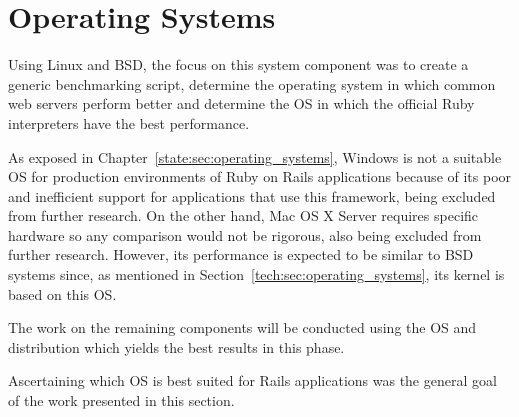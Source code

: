 \section{Operating Systems} %
\label{solution:sec:operating_systems}
Using Linux and BSD, the focus on this system component was to create a generic benchmarking script, determine the operating system in which common web servers perform better and determine the OS in which the official Ruby interpreters have the best performance.

As exposed in Chapter~\ref{state:sec:operating_systems}, Windows is not a suitable OS for production environments of Ruby on Rails applications because of its poor and inefficient support for applications that use this framework, being excluded from further research. On the other hand, Mac OS X Server requires specific hardware so any comparison would not be rigorous, also being excluded from further research. However, its performance is expected to be similar to BSD systems since, as mentioned in Section~\ref{tech:sec:operating_systems}, its kernel is based on this OS. 

The work on the remaining components will be conducted using the OS and distribution which yields the best results in this phase.

Ascertaining which OS is best suited for Rails applications was the general goal of the work presented in this section.

